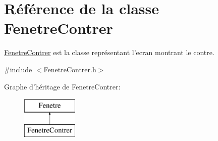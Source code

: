 \hypertarget{classFenetreContrer}{\section{\-Référence de la classe \-Fenetre\-Contrer}
\label{classFenetreContrer}
}


\hyperlink{classFenetreContrer}{\-Fenetre\-Contrer} est la classe représentant l'ecran montrant le contre.  




{\ttfamily \#include $<$\-Fenetre\-Contrer.\-h$>$}

\-Graphe d'héritage de \-Fenetre\-Contrer\-:\begin{figure}[H]
\begin{center}
\leavevmode
\includegraphics[height=2.000000cm]{classFenetreContrer}
\end{center}
\end{figure}
